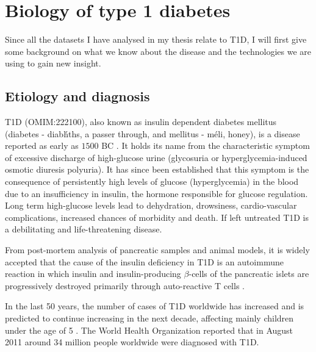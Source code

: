 \section{Biology of type 1 diabetes}

Since all the datasets I have analysed in my thesis relate to \gls{T1D}, I will first give some background on
what we know about the disease and the technologies we are using to gain new insight.

\subsection{Etiology and diagnosis}

\Gls{T1D} (OMIM:222100), also known as insulin dependent diabetes mellitus (diabetes - \foreignlanguage{greek}{diab\'hths},
a passer through, and mellitus - \foreignlanguage{greek}{m\'eli}, honey), is a disease reported as early as $1500$ BC \citep{Poretsky:2010wr}.
It holds its name from the characteristic symptom of excessive discharge of high-glucose urine (glycosuria or hyperglycemia-induced osmotic diuresis polyuria).
It has since been established that this symptom is the consequence of persistently high levels of glucose (hyperglycemia) in the blood due to an insufficiency in insulin,
the hormone responsible for glucose regulation.
Long term high-glucose levels lead to dehydration, drowsiness, cardio-vascular complications, increased chances of morbidity and death.  
If left untreated T1D is a debilitating and life-threatening disease.

From post-mortem analysis of pancreatic samples and animal models,
it is widely accepted that the cause of the insulin deficiency in \gls{T1D} is an autoimmune reaction
in which insulin and insulin-producing $\beta$-cells of the pancreatic islets
are progressively destroyed primarily through auto-reactive T cells \citep{Todd:2010bl}.  

In the last 50 years, the number of cases of T1D worldwide has increased and is predicted to continue increasing in the next decade,
affecting mainly children under the age of 5 \citep{Patterson:2009gj}.
The World Health Organization reported that in August 2011 around 34 million people worldwide were diagnosed with T1D.

